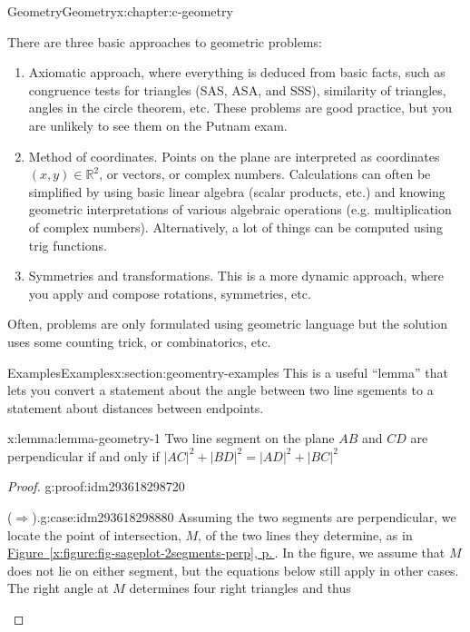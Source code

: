 \documentclass[twoside,10pt,]{book}
\newcommand{\xreffont}{\relax}
\numberwithin{equation}{section}
\begin{document}
\begin{chapterptx}{Geometry}{}{Geometry}{}{}{x:chapter:c-geometry}
\begin{introduction}{}%
There are three basic approaches to geometric problems:%
\begin{enumerate}[label=(\arabic*)]
\item{}Axiomatic approach, where everything is deduced from basic facts, such as congruence tests for triangles (SAS, ASA, and SSS), similarity of triangles, angles in the circle theorem, etc. These problems are good practice, but you are unlikely to see them on the Putnam exam.%
\item{}Method of coordinates. Points on the plane are interpreted as coordinates \((x,y) \in \mathbb{R}^2\), or vectors, or complex numbers. Calculations can often be simplified by using basic linear algebra (scalar products, etc.) and knowing geometric interpretations of various algebraic operations (e.g. multiplication of complex numbers). Alternatively, a lot of things can be computed using trig functions.%
\item{}Symmetries and transformations. This is a more dynamic approach, where you apply and compose rotations, symmetries, etc.%
\end{enumerate}
Often, problems are only formulated using geometric language but the solution uses some counting trick, or combinatorics, etc.%
\end{introduction}%
%
%
\typeout{************************************************}
\typeout{************************************************}
%
\begin{sectionptx}{Examples}{}{Examples}{}{}{x:section:geomentry-examples}
This is a useful ``lemma'' that lets you convert a statement about the angle between two line sgements to a statement about distances between endpoints.%
\begin{lemma}{}{}{x:lemma:lemma-geometry-1}%
Two line segment on the plane \(AB\) and \(CD\) are perpendicular if and only if \(\lvert AC \rvert^2 +  \lvert BD \rvert^2 = \lvert AD \rvert^2 + \lvert BC \rvert^2\)%
\end{lemma}
\begin{proof}{}{g:proof:idm293618298720}
\begin{case}{}{(\(\Rightarrow\)).}{g:case:idm293618298880}
Assuming the two segments are perpendicular, we locate the point of intersection, \(M\), of the two lines they determine, as in \hyperref[x:figure:fig-sageplot-2segments-perp]{Figure~{\xreffont\ref{x:figure:fig-sageplot-2segments-perp}}, p.\,\pageref{x:figure:fig-sageplot-2segments-perp}}.  In the figure, we assume that \(M\) does not lie on either segment, but the equations below still apply in other cases. The right angle at \(M\) determines four right triangles and thus%

\end{case}
\end{proof}
\end{sectionptx}
\end{chapterptx}
\end{document}
